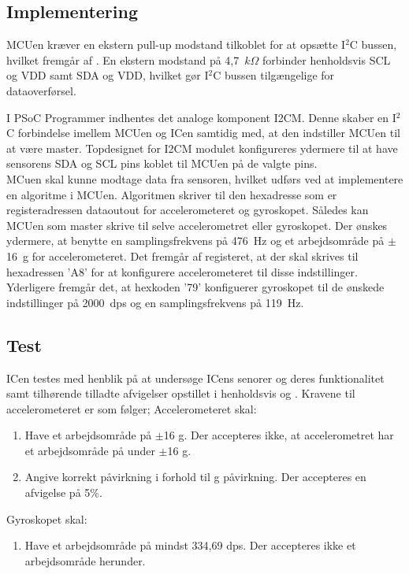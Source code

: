 \subsection{Implementering}
MCUen kræver en ekstern pull-up modstand tilkoblet for at opsætte I$^{2}$C bussen, hvilket fremgår af . En ekstern modstand på 4,7~$k\Omega$ forbinder henholdsvis SCL og VDD samt SDA og VDD, hvilket gør I$^{2}$C bussen tilgængelige for dataoverførsel.

I PSoC Programmer indhentes det analoge komponent I2CM. Denne skaber en I$^2$C forbindelse imellem MCUen og ICen samtidig med, at den indstiller MCUen til at være master. %
Topdesignet for I2CM modulet konfigureres ydermere til at have sensorens SDA og SCL pins koblet til MCUen på de valgte pins.\\
MCuen skal kunne modtage data fra sensoren, hvilket udførs ved at implementere en algoritme i MCUen. Algoritmen skriver til den hexadresse som er registeradressen dataoutout for accelerometeret og gyroskopet. Således kan MCUen som master skrive til selve accelerometret eller gyroskopet. Der ønskes ydermere, at benytte en samplingsfrekvens på 476~Hz og et arbejdsområde på $\pm$16~g for accelerometeret. Det fremgår af registeret, at der skal skrives til hexadressen 'A8' for at konfigurere accelerometeret til disse indstillinger. \\
Yderligere fremgår det, at hexkoden '79' konfiguerer gyroskopet til de ønskede indstillinger på 2000~dps og en samplingsfrekvens på 119~Hz. \citep{STMicroelectronics2016}


\subsection{Test}
ICen testes med henblik på at undersøge ICens senorer og deres funktionalitet samt tilhørende tilladte afvigelser opstillet i henholdsvis  og . Kravene til accelerometeret er som følger;
Accelerometeret skal:
\begin{enumerate}
	\item Have et arbejdsområde på $\pm$16 g. Der accepteres ikke, at accelerometret har et arbejdsområde på under $\pm$16 g.
	\item Angive korrekt påvirkning i forhold til g påvirkning. Der accepteres en afvigelse på 5\%.
\end{enumerate}
Gyroskopet skal:
\begin{enumerate}
	\item Have et arbejdsområde på mindst 334,69 dps. Der accepteres ikke et arbejdsområde herunder.
\end{enumerate}

